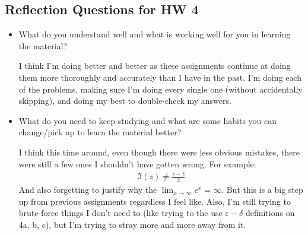 \subsection*{Reflection Questions for HW 4}
    \begin{itemize}
        \item What do you understand well and what is working well for you in learning the material?
		\begin{reflection}
			I think I'm doing better and better as these assignments continue at doing them more thoroughly and accurately than I have in the past. I'm doing each of the problems, making sure I'm doing every single one (without accidentally skipping), and doing my best to double-check my answers.
		\end{reflection}

        \item What do you need to keep studying and what are some habits you can change/pick up to learn the material better?
		\begin{reflection}
			I think this time around, even though there were less obvious mistakes, there were still a few ones I shouldn't have gotten wrong. For example:
			\begin{align*}
				\Im(z)\ne \frac{z-\bar z}{2}
			\end{align*}
			And also forgetting to justify why the $\lim_{x\to\infty}e^x = \infty$. But this is a big step up from previous assignments regardless I feel like. \gline{}
			Also, I'm still trying to brute-force things I don't need to (like trying to the use $\varepsilon{-}\delta$ definitions on 4a, b, c), but I'm trying to stray more and more away from it. 
		\end{reflection}

    \end{itemize}
